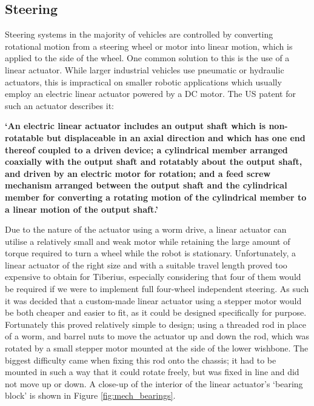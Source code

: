 \subsection{Steering}
Steering systems in the majority of vehicles are controlled by converting rotational motion from a steering wheel or motor into linear motion, which is applied to the side of the wheel. One common solution to this is the use of a linear actuator. While larger industrial vehicles use pneumatic or hydraulic actuators, this is impractical on smaller robotic applications which usually employ an electric linear actuator powered by a DC motor. The US patent for such an actuator describes it: 

\begin{displayquote}
\textbf{`An electric linear actuator includes an output shaft which is non-rotatable but displaceable in an axial direction and which has one end thereof coupled to a driven device; a cylindrical member arranged coaxially with the output shaft and rotatably about the output shaft, and driven by an electric motor for rotation; and a feed screw mechanism arranged between the output shaft and the cylindrical member for converting a rotating motion of the cylindrical member to a linear motion of the output shaft.'} \cite{Dun_patent}
\end{displayquote}
Due to the nature of the actuator using a worm drive, a linear actuator can utilise a relatively small and weak motor while retaining the large amount of torque required to turn a wheel while the robot is stationary. Unfortunately, a linear actuator of the right size and with a suitable travel length proved too expensive to obtain for Tiberius, especially considering that four of them would be required if we were to implement full four-wheel independent steering. As such it was decided that a custom-made linear actuator using a stepper motor would be both cheaper and easier to fit, as it could be designed specifically for purpose.
\newline
Fortunately this proved relatively simple to design; using a threaded rod in place of a worm, and barrel nuts to move the actuator up and down the rod, which was rotated by a small stepper motor mounted at the side of the lower wishbone. The biggest difficulty came when fixing this rod onto the chassis; it had to be mounted in such a way that it could rotate freely, but was fixed in line and did not move up or down. A close-up of the interior of the linear actuator's `bearing block' is shown in Figure \ref{fig:mech_bearings}.
